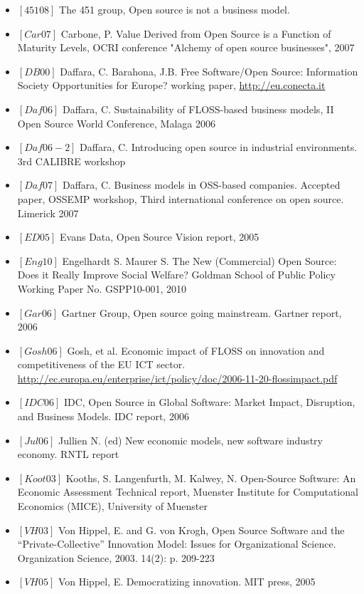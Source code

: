\begin{itemize}
 \item $[451 08]$ The 451 group, Open source is not a business model.
 \item $[Car 07]$ Carbone, P. Value Derived from Open Source is a Function of
Maturity Levels, OCRI conference "Alchemy of open source businesses", 2007
 \item $[DB 00]$ Daffara, C. Barahona, J.B. Free Software/Open Source: Information
Society Opportunities for Europe? working paper, \url{http://eu.conecta.it}
 \item $[Daf 06]$ Daffara, C. Sustainability of FLOSS-based business models, II
Open Source World Conference, Malaga 2006
 \item $[Daf 06-2]$ Daffara, C. Introducing open source in industrial environments.
3rd CALIBRE workshop
 \item $[Daf 07]$ Daffara, C. Business models in OSS-based companies. Accepted
paper, OSSEMP workshop, Third international conference on open source. Limerick 2007
 \item $[ED 05]$ Evans Data, Open Source Vision report, 2005 
 \item $[Eng 10]$ Engelhardt S. Maurer S. The New (Commercial) Open Source: Does it
Really Improve Social Welfare? Goldman School of Public Policy Working Paper
No. GSPP10-001, 2010
 \item $[Gar 06]$ Gartner Group, Open source going mainstream. Gartner report, 2006
 \item $[Gosh 06]$ Gosh, et al. Economic impact of FLOSS on innovation and
competitiveness of the EU ICT sector.
\url{http://ec.europa.eu/enterprise/ict/policy/doc/2006-11-20-flossimpact.pdf}
 \item $[IDC 06]$ IDC, Open Source in Global Software: Market Impact, Disruption,
and Business Models. IDC report, 2006
 \item $[Jul 06]$ Jullien N. (ed) New economic models, new software industry economy.
RNTL report
 \item $[Koot 03]$ Kooths, S. Langenfurth, M. Kalwey, N. Open-Source Software:
An Economic Assessment Technical report, Muenster Institute for Computational Economics
(MICE), University of Muenster
 \item $[VH 03]$ Von Hippel, E. and G. von Krogh, Open Source Software and the
``Private-Collective'' Innovation Model: Issues for Organizational Science.
Organization Science, 2003. 14(2): p. 209-223
 \item $[VH 05]$ Von Hippel, E. Democratizing innovation. MIT press, 2005
\end{itemize}
